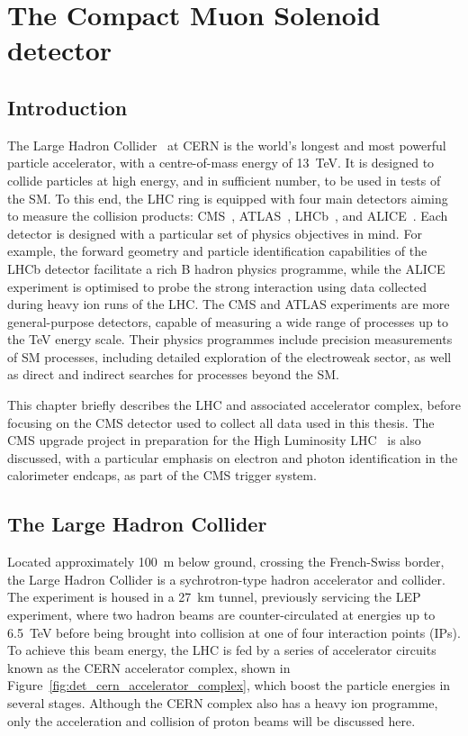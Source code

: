 \chapter{The Compact Muon Solenoid detector}
\label{chap:detector}

\section{Introduction}


The Large Hadron Collider~\cite{LHCTDR} at CERN is the world's longest and most powerful particle accelerator, with a centre-of-mass energy of 13~TeV. It is designed to collide particles at high energy, and in sufficient number, to be used in tests of the SM. To this end, the LHC ring is equipped with four main detectors aiming to measure the collision products: CMS~\cite{CMS}, ATLAS~\cite{ATLAS}, LHCb~\cite{LHCb}, and ALICE~\cite{ALICE}. Each detector is designed with a particular set of physics objectives in mind. For example, the forward geometry and particle identification capabilities of the LHCb detector facilitate a rich B hadron physics programme, while the ALICE experiment is optimised to probe the strong interaction using data collected during heavy ion runs of the LHC. %
The CMS and ATLAS experiments are more general-purpose detectors, capable of measuring a wide range of processes up to the TeV energy scale. Their physics programmes include precision measurements of SM processes, including detailed exploration of the electroweak sector, as well as direct and indirect searches for processes beyond the SM.

This chapter briefly describes the LHC and associated accelerator complex, before focusing on the CMS detector used to collect all data used in this thesis. The CMS upgrade project in preparation for the High Luminosity LHC~\cite{CMS_phase2_TDR} is also discussed, with a particular emphasis on electron and photon identification in the calorimeter endcaps, as part of the CMS trigger system.

\section{The Large Hadron Collider}

Located approximately 100~m below ground, crossing the French-Swiss border, the Large Hadron Collider is a sychrotron-type hadron accelerator and collider. The experiment is housed in a 27~km tunnel, previously servicing the LEP~\cite{LEPTDR} experiment, where two hadron beams are counter-circulated at energies up to 6.5~TeV before being brought into collision at one of four interaction points (IPs). To achieve this beam energy, the LHC is fed by a series of accelerator circuits known as the CERN accelerator complex, shown in Figure~\ref{fig:det_cern_accelerator_complex}, which boost the particle energies in several stages. Although the CERN complex also has a heavy ion programme, only the acceleration and collision of proton beams will be discussed here.

